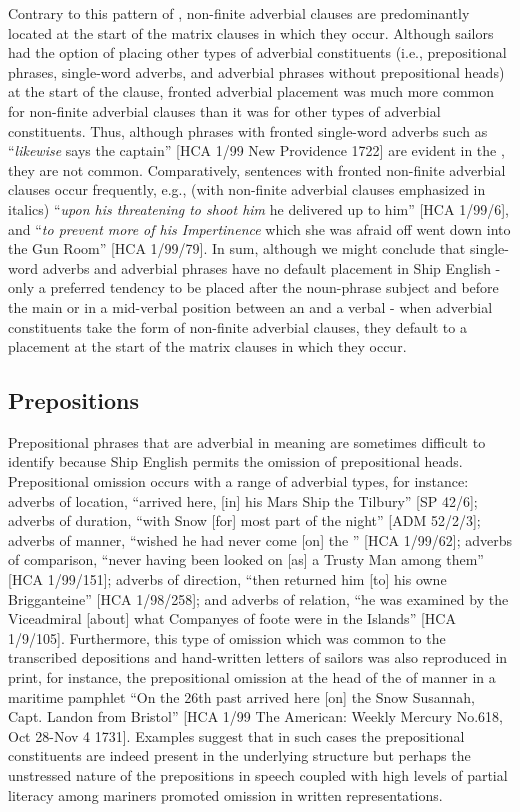 Contrary to this pattern of , non-finite adverbial clauses are predominantly located at the start of the matrix clauses in which they occur. Although sailors had the option of placing other types of adverbial constituents (i.e., prepositional phrases, single-word adverbs, and adverbial phrases without prepositional heads) at the start of the clause, fronted adverbial placement was much more common for non-finite adverbial clauses than it was for other types of adverbial constituents. Thus, although phrases with fronted single-word adverbs such as “\textit{likewise} says the captain” [HCA 1/99 New Providence 1722] are evident in the , they are not common. Comparatively, sentences with fronted non-finite adverbial clauses occur frequently, e.g., (with non-finite adverbial clauses emphasized in italics) “\textit{upon his threatening to shoot him} he delivered up to him” [HCA 1/99/6], and “\textit{to prevent more of his Impertinence} which she was afraid off went down into the Gun Room” [HCA 1/99/79]. In sum, although we might conclude that single-word adverbs and adverbial phrases have no default placement in Ship English - only a preferred tendency to be placed after the noun-phrase subject and before the main  or in a mid-verbal position between an  and a verbal  - when adverbial constituents take the form of non-finite adverbial clauses, they default to a placement at the start of the matrix clauses in which they occur. 

\subsection{{Prepositions} }%

Prepositional phrases that are adverbial in meaning are sometimes difficult to identify because Ship English permits the omission of prepositional heads. Prepositional omission occurs with a range of adverbial types, for instance: adverbs of location, “arrived here, [in] his Mars Ship the Tilbury” [SP 42/6]; adverbs of duration, “with Snow [for] most part of the night” [ADM 52/2/3]; adverbs of manner, “wished he had never come [on] the ” [HCA 1/99/62]; adverbs of comparison, “never having been looked on [as] a Trusty Man among them” [HCA 1/99/151]; adverbs of direction, “then returned him [to] his owne Brigganteine” [HCA 1/98/258]; and adverbs of relation, “he was examined by the Viceadmiral [about] what Companyes of foote were in the Islands” [HCA 1/9/105]. Furthermore, this type of omission which was common to the transcribed depositions and hand-written letters of sailors was also reproduced in print, for instance, the prepositional omission at the head of the  of manner in a maritime pamphlet “On the 26th past arrived here [on] the Snow Susannah, Capt. Landon from Bristol” [HCA 1/99 The American: Weekly Mercury No.618, Oct 28-Nov 4 1731]. Examples suggest that in such cases the prepositional constituents are indeed present in the underlying structure but perhaps the unstressed nature of the prepositions in speech coupled with high levels of partial literacy among mariners promoted omission in written representations. 

